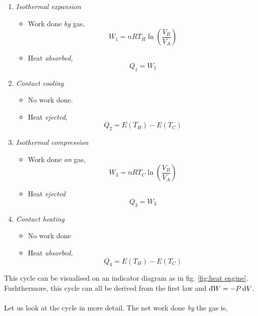 \documentclass{book}
\newcommand{\dbar}{\mathrm{d}\hspace*{-0.08em}\bar{}\hspace*{0.1em}}
\begin{document}
\begin{enumerate}
	\item \textit{Isothermal expansion}
	\begin{itemize}
		\item Work done \textit{by} gas,
		\begin{equation}
			W_1 = nRT_H\ln{\left(\frac{V_B}{V_A}\right)}
		\end{equation}
		\item Heat \textit{absorbed},
		\begin{equation}
			Q_1 = W_1
		\end{equation}
	\end{itemize}
	\item \textit{Contact cooling}
	\begin{itemize}
		\item No work done.
		\item Heat \textit{ejected},
		\begin{equation}
			Q_2 = E(T_H) - E(T_C)
		\end{equation}
	\end{itemize}
	\item \textit{Isothermal compression}
	\begin{itemize}
		\item Work done \textit{on} gas,
		\begin{equation}
			W_3 = nRT_C\ln\left(\frac{V_B}{V_A}\right)
		\end{equation}
		\item Heat \textit{ejected}
		\begin{equation}
			Q_3 = W_3
		\end{equation}
	\end{itemize}
	\item \textit{Contact heating}
	\begin{itemize}
		\item No work done
		\item Heat \textit{absorbed},
		\begin{equation}
			Q_4 = E(T_H) - E(T_C)
		\end{equation}
	\end{itemize}
\end{enumerate}
This cycle can be visualised on an indicator diagram as in fig. \ref{fig:heat engine}. Furhthermore, this cycle can all be derived from the first law and $\dbar W = -P\dd{V}$. 
\\\\
Let us look at the cycle in more detail. The net work done \textit{by} the gas is,
\end{document}
